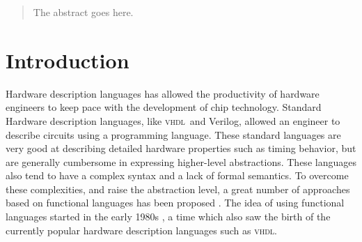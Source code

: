 \documentclass[conference,pdf,a4paper,10pt,final,twoside,twocolumn]{IEEEtran}
\def\VHDL{\textsc{vhdl}}
\begin{document}




\maketitle


\begin{abstract}
The abstract goes here.
\end{abstract}





%
\IEEEpeerreviewmaketitle


\section{Introduction}
Hardware description languages has allowed the productivity of hardware engineers to keep pace with the development of chip technology. Standard Hardware description languages, like \VHDL\ and Verilog, allowed an engineer to describe circuits using a programming language. These standard languages are very good at describing detailed hardware properties such as timing behavior, but are generally cumbersome in expressing higher-level abstractions. These languages also tend to have a complex syntax and a lack of formal semantics. To overcome these complexities, and raise the abstraction level, a great number of approaches based on functional languages has been proposed \cite{T-Ruby,Hydra,HML2,Hawk1,Lava,ForSyDe1,Wired,reFLect}. The idea of using functional languages started in the early 1980s \cite{Cardelli1981,muFP,DAISY,FHDL}, a time which also saw the birth of the currently popular hardware description languages such as \VHDL.
\end{document}
